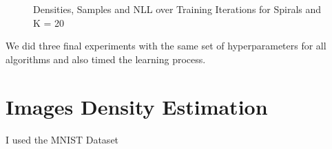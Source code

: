 \begin{figure}[H]
    \centering
    \caption{Densities, Samples and NLL over Training Iterations for Spirals and K = 20}
    \label{fig:spirals_20}
\end{figure}

\newpage

We did three final experiments with the same set of hyperparameters for all algorithms and also timed the 
learning process. 

\newpage
\section{Images Density Estimation}

I used the MNIST Dataset \cite{mnist} 

